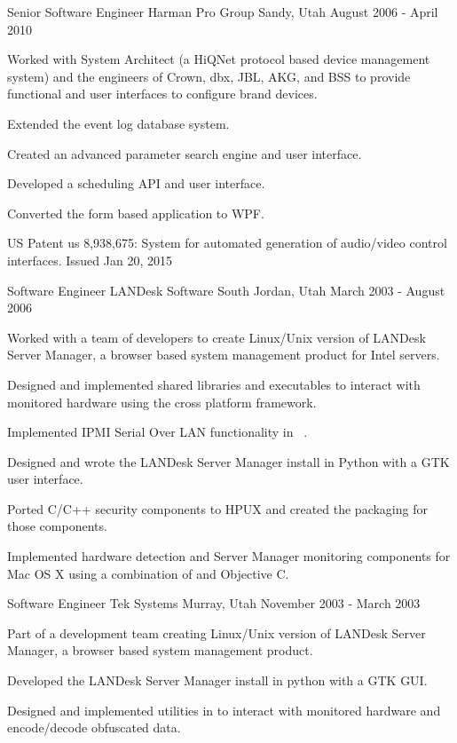 \cventry
{Senior Software Engineer} %
{Harman Pro Group} %
{Sandy, Utah} %
{August 2006 - April 2010} %
{
	\begin{cvitems} %
		\item {Worked with System Architect (a HiQNet protocol based device management system) and the engineers of Crown, dbx, JBL, AKG, and BSS to provide functional and user interfaces to configure brand devices.}
		\item {Extended the event log database system.}
		\item {Created an advanced parameter search engine and user interface.}
		\item {Developed a scheduling API and user interface.}
		\item {Converted the \Csh{} form based application to WPF.}
		\item {US Patent us 8,938,675: System for automated generation of audio/video control interfaces. Issued Jan 20, 2015}
	\end{cvitems}
}

\cventry
{Software Engineer} %
{LANDesk Software} %
{South Jordan, Utah} %
{March 2003 - August 2006} %
{
	\begin{cvitems} %
		\item {Worked with a team of developers to create Linux/Unix version of LANDesk Server Manager, a browser based system management product for Intel servers.}
		\item {Designed and implemented shared libraries and executables to interact with monitored hardware using the cross platform \Cpp{} framework.}
		\item {Implemented IPMI Serial Over LAN functionality in \
			\Cpp{}.}
		\item {Designed and wrote the LANDesk Server Manager install in Python with a GTK user interface.}
		\item {Ported C/C++ security components to HPUX and created the packaging for those components.}
		\item {Implemented hardware detection and Server Manager monitoring components for Mac OS X using a combination of \Cpp{} and Objective C.}
	\end{cvitems}
}

\cventry
{Software Engineer}
{Tek Systems}
{Murray, Utah}
{November 2003 - March 2003}
{
	\begin{cvitems} %
		\item {Part of a development team creating Linux/Unix version of LANDesk Server Manager, a browser based system management product.}
		\item {Developed the LANDesk Server Manager install in python with a GTK GUI.}
		\item {Designed and implemented utilities in \Cpp{} to interact with monitored hardware and encode/decode obfuscated data.}
	\end{cvitems}
}


